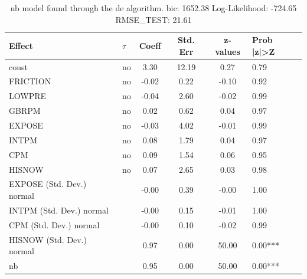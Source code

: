 \begin{table}
	\caption{nb model found through the de algorithm. bic: 1652.38 Log-Likelihood: -724.65 RMSE_TEST: 21.61}
	\begin{center}
		\begin{tabular}{|l|l|c|c|c|l|}
			\hline
			Effect & $\tau$ & Coeff & Std. Err & z-values & Prob |z|>Z \\
			\hline
			const & no & 3.30 & 12.19 & 0.27 & 0.79 \\
			\hline
			FRICTION & no & -0.02 & 0.22 & -0.10 & 0.92 \\
			\hline
			LOWPRE & no & -0.04 & 2.60 & -0.02 & 0.99 \\
			\hline
			GBRPM & no & 0.02 & 0.62 & 0.04 & 0.97 \\
			\hline
			EXPOSE & no & -0.03 & 4.02 & -0.01 & 0.99 \\
			\hline
			INTPM & no & 0.08 & 1.79 & 0.04 & 0.97 \\
			\hline
			CPM & no & 0.09 & 1.54 & 0.06 & 0.95 \\
			\hline
			HISNOW & no & 0.07 & 2.65 & 0.03 & 0.98 \\
			\hline
			EXPOSE (Std. Dev.) normal &  & -0.00 & 0.39 & -0.00 & 1.00 \\
			\hline
			INTPM (Std. Dev.) normal &  & -0.00 & 0.15 & -0.01 & 1.00 \\
			\hline
			CPM (Std. Dev.) normal &  & -0.00 & 0.10 & -0.02 & 0.99 \\
			\hline
			HISNOW (Std. Dev.) normal &  & 0.97 & 0.00 & 50.00 & 0.00*** \\
			\hline
			nb &  & 0.95 & 0.00 & 50.00 & 0.00*** \\
			\hline
		\end{tabular}
	\end{center}
\end{table}
